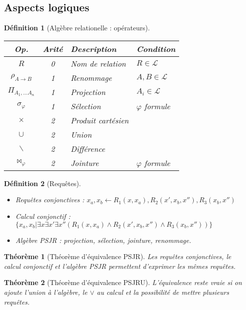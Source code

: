\documentclass[landscape]{article}
\renewcommand{\L}{\mathscr{L}}
\newcommand{\1}{\mathbbm{1}}
\newcommand{\0}{\mathbbm{0}}
\renewcommand{\phi}{\varphi}
\newtheorem{theo}{Théorème}
\newtheorem{defi}{Définition}
\begin{document}
\begin{multicols}{2}
    \section{Aspects logiques}

    \begin{defi}[Algèbre relationelle : opérateurs]
        \begin{tabular}{ccll}
            \hline
            Op. & Arité & Description & Condition \\
            \hline
            $R$ & 0 & Nom de relation & $R \in \L$ \\
            $\rho_{A\rightarrow B}$ & 1 & Renommage & $A,B\in\L$ \\
            $\Pi_{A_1,\ldots A_n}$ & 1 & Projection & $A_i\in\L$ \\
            $\sigma_\phi$ & 1 & Sélection & $\phi$ formule \\
            $\times$ & 2 & Produit cartésien & \\
            $\cup$ & 2 & Union & \\
            $\backslash$ & 2 & Différence & \\
            $\bowtie_\phi$ & 2 & Jointure & $\phi$ formule \\
            \hline
        \end{tabular}
    \end{defi}

    \begin{defi}[Requêtes] \begin{itemize}
        \item Requêtes conjonctives : $x_a, x_b \leftarrow R_1(x, x_a), R_2(x', x_b, x''), R_3(x_b, x'')$
        \item Calcul conjonctif : $\{x_a, x_b | \exists x \exists x' \exists x''(R_1(x, x_a)\wedge R_2(x', x_b, x'')\wedge R_3(x_b, x'')) \}$
        \item Algèbre PSJR : projection, sélection, jointure, renommage.
    \end{itemize}\end{defi}

    \begin{theo}[Théorème d'équivalence PSJR]
        Les requêtes conjonctives, le calcul conjonctif et l'algèbre PSJR permettent
        d'exprimer les mêmes requêtes.
    \end{theo}

    \begin{theo}[Théorème d'équivalence PSJRU]
        L'équivalence reste vraie si on ajoute l'union à l'algèbre, le $\vee$ au
        calcul et la possibilité de mettre plusieurs requêtes.
    \end{theo}


\end{multicols}
\end{document}
